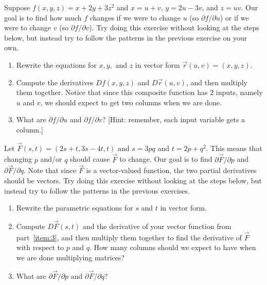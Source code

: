 \begin{problem}
%
 Suppose $f(x,y,z) = x+2y+3z^2$ and $x=u+v$, $y=2u-3v$, and $z=uv$. Our goal is to find how much $f$ changes if we were to change $u$ (so $\partial f/\partial u$) or if we were to change $v$ (so $\partial f/\partial v$). Try doing this exercise without looking at the steps below, but instead try to follow the patterns in the previous exercise on your own. 
 \begin{enumerate}
  \item Rewrite the equations for $x,y,$ and $z$ in vector form $\vec r(u,v)=(x,y,z)$. %
  \item Compute the derivatives $Df(x,y,z)$ and $D\vec r(u,v)$, and then multiply them together. Notice that since this composite function has 2 inputs, namely $u$ and $v$, we should expect to get two columns when we are done.
  \item What are $\partial f/\partial u$ and $\partial f/\partial v$? [Hint: remember, each input variable gets a column.]
 \end{enumerate}
\end{problem}


\begin{problem}
 Let $\vec F(s,t) = (2s+t,3s-4t,t)$ and $s=3pq$ and $t=2p+q^2$.  This means that changing $p$ and/or $q$ should cause $\vec F$ to change. Our goal is to find $\partial \vec F/\partial p$ and $\partial \vec F/\partial q$. Note that since $\vec F$ is a vector-valued function, the two partial derivatives should be vectors. Try doing this exercise without looking at the steps below, but instead try to follow the patterns in the previous exercises. 
 \begin{enumerate}
  \item\label{item:3} Rewrite the parametric equations for $s$ and $t$ in vector form.
  \item Compute $D\vec F(s,t)$ and the derivative of your vector function from part~\ref{item:3}, and then multiply them together to find the derivative of $\vec F$ with respect to $p$ and $q$.  How many columns should we expect to have when we are done multiplying matrices?
  \item What are $\partial \vec F/\partial p$ and $\partial \vec F/\partial q$? 
 \end{enumerate}
\end{problem}

